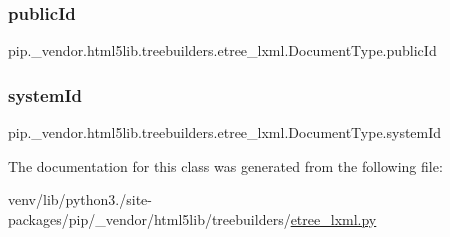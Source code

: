 \subsubsection{\texorpdfstring{public\+Id}{publicId}}
{\footnotesize\ttfamily pip.\+\_\+vendor.\+html5lib.\+treebuilders.\+etree\+\_\+lxml.\+Document\+Type.\+public\+Id}

\mbox{\label{classpip_1_1__vendor_1_1html5lib_1_1treebuilders_1_1etree__lxml_1_1DocumentType_a23be3660c4dbba33a5a742f060b8fc27}} 
\subsubsection{\texorpdfstring{system\+Id}{systemId}}
{\footnotesize\ttfamily pip.\+\_\+vendor.\+html5lib.\+treebuilders.\+etree\+\_\+lxml.\+Document\+Type.\+system\+Id}



The documentation for this class was generated from the following file\+:\begin{DoxyCompactItemize}
\item 
venv/lib/python3./site-\/packages/pip/\+\_\+vendor/html5lib/treebuilders/\hyperlink{treebuilders_2etree__lxml_8py}{etree\+\_\+lxml.\+py}\end{DoxyCompactItemize}
